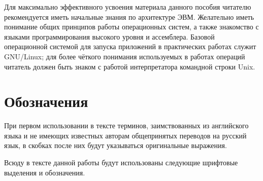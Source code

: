 Для максимально эффективного усвоения материала данного пособия читателю рекомендуется иметь начальные знания по архитектуре ЭВМ. Желательно иметь понимание общих принципов работы операционных систем, а также знакомство с языками программирования высокого уровня и ассемблера. Базовой операционной системой для запуска приложений в практических работах служит GNU/Linux; для более чёткого понимания используемых в работах операций читатель должен быть знаком с работой интерпретатора командной строки Unix.

\section{Обозначения}
При первом использовании в тексте терминов, заимствованных из английского языка и не имеющих известных авторам общепринятых переводов на русский язык, в скобках после них будут указываться оригинальные выражения.

Всюду в тексте данной работы будут использованы следующие шрифтовые выделения и обозначения.

